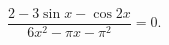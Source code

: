 \begin{ex}[type=equation]
	\begin{condition}
		$\ \dfrac{2 - 3\sin x -\cos 2x}{6x^2 -\pi x -\pi^2} = 0. $
	\end{condition}
\end{ex}